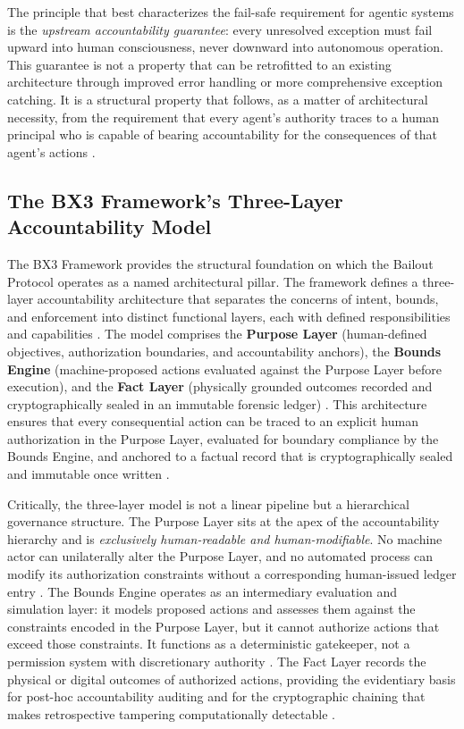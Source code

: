 The principle that best characterizes the fail-safe requirement for agentic systems is the \emph{upstream accountability guarantee}: every unresolved exception must fail upward into human consciousness, never downward into autonomous operation. This guarantee is not a property that can be retrofitted to an existing architecture through improved error handling or more comprehensive exception catching. It is a structural property that follows, as a matter of architectural necessity, from the requirement that every agent's authority traces to a human principal who is capable of bearing accountability for the consequences of that agent's actions \cite{wiener1948}.

\subsection{The BX3 Framework's Three-Layer Accountability Model}

The BX3 Framework provides the structural foundation on which the Bailout Protocol operates as a named architectural pillar. The framework defines a three-layer accountability architecture that separates the concerns of intent, bounds, and enforcement into distinct functional layers, each with defined responsibilities and capabilities \cite{tristr81}. The model comprises the \textbf{Purpose Layer} (human-defined objectives, authorization boundaries, and accountability anchors), the \textbf{Bounds Engine} (machine-proposed actions evaluated against the Purpose Layer before execution), and the \textbf{Fact Layer} (physically grounded outcomes recorded and cryptographically sealed in an immutable forensic ledger) \cite{wiener1948}. This architecture ensures that every consequential action can be traced to an explicit human authorization in the Purpose Layer, evaluated for boundary compliance by the Bounds Engine, and anchored to a factual record that is cryptographically sealed and immutable once written \cite{bansal2019}.

Critically, the three-layer model is not a linear pipeline but a hierarchical governance structure. The Purpose Layer sits at the apex of the accountability hierarchy and is \emph{exclusively human-readable and human-modifiable}. No machine actor can unilaterally alter the Purpose Layer, and no automated process can modify its authorization constraints without a corresponding human-issued ledger entry \cite{dijkstra1982}. The Bounds Engine operates as an intermediary evaluation and simulation layer: it models proposed actions and assesses them against the constraints encoded in the Purpose Layer, but it cannot authorize actions that exceed those constraints. It functions as a deterministic gatekeeper, not a permission system with discretionary authority \cite{tristr81}. The Fact Layer records the physical or digital outcomes of authorized actions, providing the evidentiary basis for post-hoc accountability auditing and for the cryptographic chaining that makes retrospective tampering computationally detectable \cite{bansal2019}.

